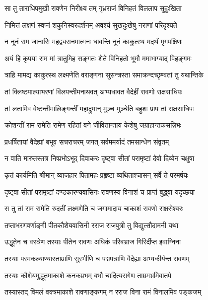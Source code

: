 
\twolineshloka
{सा तु ताराधिपमुखी रावणेन निरीक्ष्य तम्}
{गृध्रराजं विनिहतं विललाप सुदुःखिता} %

\twolineshloka
{निमित्तं लक्षणं स्वप्नं शकुनिस्वरदर्शनम्}
{अवश्यं सुखदुःखेषु नराणां परिदृश्यते} %

\twolineshloka
{न नूनं राम जानासि महद्व्यसनमात्मनः}
{धावन्ति नूनं काकुत्स्थ मदर्थं मृगपक्षिणः} %

\twolineshloka
{अयं हि कृपया राम मां त्रातुमिह सङ्गतः}
{शेते विनिहतो भूमौ ममाभाग्याद् विहङ्गमः} %

\twolineshloka
{त्राहि मामद्य काकुत्स्थ लक्ष्मणेति वराङ्गना}
{सुसन्त्रस्ता समाक्रन्दच्छृण्वतां तु यथान्तिके} %

\twolineshloka
{तां क्लिष्टमाल्याभरणां विलपन्तीमनाथवत्}
{अभ्यधावत वैदेहीं रावणो राक्षसाधिपः} %

\twolineshloka
{तां लतामिव वेष्टन्तीमालिङ्गन्तीं महाद्रुमान्}
{मुञ्च मुञ्चेति बहुशः प्राप तां राक्षसाधिपः} %

\twolineshloka
{क्रोशन्तीं राम रामेति रामेण रहितां वने}
{जीवितान्ताय केशेषु जग्राहान्तकसन्निभः} %

\twolineshloka
{प्रधर्षितायां वैदेह्यां बभूव सचराचरम्}
{जगत् सर्वममर्यादं तमसान्धेन संवृतम्} %

\twolineshloka
{न वाति मारुतस्तत्र निष्प्रभोऽभूद् दिवाकरः}
{दृष्ट्वा सीतां परामृष्टां देवो दिव्येन चक्षुषा} %

\twolineshloka
{कृतं कार्यमिति श्रीमान् व्याजहार पितामहः}
{प्रहृष्टा व्यथिताश्चासन् सर्वे ते परमर्षयः} %

\twolineshloka
{दृष्ट्वा सीतां परामृष्टां दण्डकारण्यवासिनः}
{रावणस्य विनाशं च प्राप्तं बुद्ध्वा यदृच्छया} %

\twolineshloka
{स तु तां राम रामेति रुदतीं लक्ष्मणेति च}
{जगामादाय चाकाशं रावणो राक्षसेश्वरः} %

\twolineshloka
{तप्ताभरणवर्णाङ्गी पीतकौशेयवासिनी}
{रराज राजपुत्री तु विद्युत्सौदामनी यथा} %

\twolineshloka
{उद्धूतेन च वस्त्रेण तस्याः पीतेन रावणः}
{अधिकं परिबभ्राज गिरिर्दीप्त इवाग्निना} %

\twolineshloka
{तस्याः परमकल्याण्यास्ताम्राणि सुरभीणि च}
{पद्मपत्राणि वैदेह्या अभ्यकीर्यन्त रावणम्} %

\twolineshloka
{तस्याः कौशेयमुद्धूतमाकाशे कनकप्रभम्}
{बभौ चादित्यरागेण ताम्रमभ्रमिवातपे} %

\twolineshloka
{तस्यास्तद् विमलं वक्त्रमाकाशे रावणाङ्कगम्}
{न रराज विना रामं विनालमिव पङ्कजम्} %

